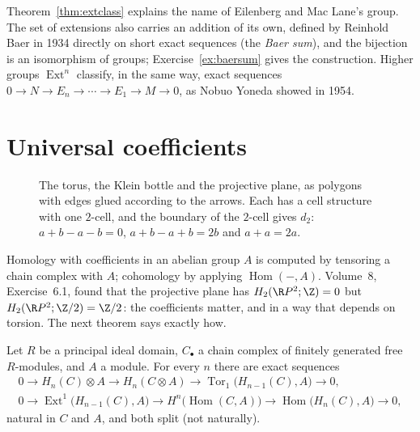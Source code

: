 Theorem~\ref{thm:extclass} explains the name of Eilenberg and Mac Lane's group. The set of extensions also carries an addition of its own, defined by Reinhold Baer in 1934 directly on short exact sequences (the
\emph{Baer sum}), and the bijection is an isomorphism of groups; Exercise~\ref{ex:baersum} gives the construction. Higher groups $\operatorname{Ext}^n$ classify, in the same way, exact sequences
$0\to N\to E_n\to\cdots\to E_1\to M\to0$, as Nobuo Yoneda showed in 1954.

\section{Universal coefficients}

\begin{figure}[ht]
\centering
{}
\caption{The torus, the Klein bottle and the projective plane, as polygons with edges glued according to the arrows. Each has a cell structure with one $2$-cell, and the boundary of the $2$-cell gives $d_2$:
$a+b-a-b=0$, $a+b-a+b=2b$ and $a+a=2a$.}
\label{fig:surfaces}
\end{figure}

Homology with coefficients in an abelian group $A$ is computed by tensoring a chain complex with $A$; cohomology by applying $\operatorname{Hom}(-,A)$. Volume~8, Exercise~6.1, found that the projective plane has
$H_2(\R P^2;\Z)=0$ but $H_2(\R P^2;\Z/2)=\Z/2$: the coefficients matter, and in a way that depends on torsion. The next theorem says exactly how.

\begin{theorem}\label{thm:uct}
Let $R$ be a principal ideal domain, $C_\bullet$ a chain complex of finitely generated free $R$-modules, and $A$ a module. For every $n$ there are exact sequences
\[
\begin{gathered}
0\to H_n(C)\otimes A\to H_n(C\otimes A)\to\operatorname{Tor}_1\bigl(H_{n-1}(C),A\bigr)\to0,\\
0\to\operatorname{Ext}^1\bigl(H_{n-1}(C),A\bigr)\to H^n\bigl(\operatorname{Hom}(C,A)\bigr)\to\operatorname{Hom}\bigl(H_n(C),A\bigr)\to0,
\end{gathered}
\]
natural in $C$ and $A$, and both split (not naturally).
\end{theorem}


